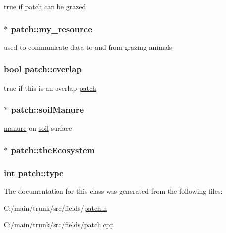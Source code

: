 true if \hyperlink{classpatch}{patch} can be grazed \hypertarget{classpatch_a97e7c201cc90ebbdc6035a8465ebbaf2}{
\subsubsection[{my\_\-resource}]{$\ast$ {\bf patch::my\_\-resource}}}
\label{classpatch_a97e7c201cc90ebbdc6035a8465ebbaf2}


used to communicate data to and from grazing animals \hypertarget{classpatch_a8f5b427e53ac95a509bc122c3ae38798}{
\subsubsection[{overlap}]{\setlength{\rightskip}{0pt plus 5cm}bool {\bf patch::overlap}}}
\label{classpatch_a8f5b427e53ac95a509bc122c3ae38798}


true if this is an overlap \hyperlink{classpatch}{patch} \hypertarget{classpatch_a5cb930252aebd6491a5fb25d9b6be618}{
\subsubsection[{soilManure}]{$\ast$ {\bf patch::soilManure}}}
\label{classpatch_a5cb930252aebd6491a5fb25d9b6be618}


\hyperlink{classmanure}{manure} on \hyperlink{classsoil}{soil} surface \hypertarget{classpatch_a64f864d5f2b8b5cfd782490073cabd1d}{
\subsubsection[{theEcosystem}]{$\ast$ {\bf patch::theEcosystem}}}
\label{classpatch_a64f864d5f2b8b5cfd782490073cabd1d}
\hypertarget{classpatch_ab5d8e4af96815a6b8ce482b5dc5e703f}{
\subsubsection[{type}]{\setlength{\rightskip}{0pt plus 5cm}int {\bf patch::type}}}
\label{classpatch_ab5d8e4af96815a6b8ce482b5dc5e703f}


The documentation for this class was generated from the following files:\begin{DoxyCompactItemize}
\item 
C:/main/trunk/src/fields/\hyperlink{patch_8h}{patch.h}\item 
C:/main/trunk/src/fields/\hyperlink{patch_8cpp}{patch.cpp}\end{DoxyCompactItemize}
